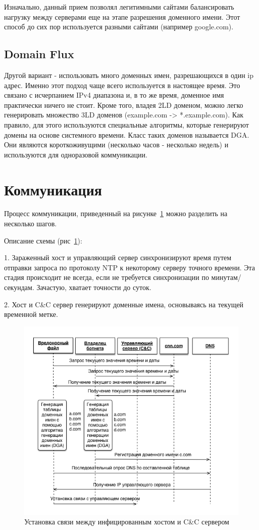 \documentclass[a4paper,14pt]{extreport} %
\begin{document}
Изначально, данный прием позволял легитимными сайтами балансировать нагрузку между серверами еще на этапе разрешения доменного имени. Этот способ до сих пор используется разными сайтами (например google.com).
	
\subsection{Domain Flux}
\label{ss:dflux}
Другой вариант - использовать много доменных имен, разрешающихся в один ip адрес. Именно этот подход чаще всего используется в настоящее время. Это связано с исчерпанием IPv4 диапазона и, в то же время, доменное имя практически ничего не стоит. Кроме того, владея 2LD доменом, можно легко генерировать множество 3LD доменов (example.com -> *.example.com).
Как правило, для этого используются специальные алгоритмы, которые генерируют домены на основе системного времени. Класс таких доменов называется DGA. Они являются короткоживущими (несколько часов - несколько недель) и используются для одноразовой коммуникации. 



\section{Коммуникация}
Процесс коммуникации, приведенный на рисунке~\ref{fig:comn} можно разделить на несколько шагов.

Описание схемы (рис~\ref{fig:comn}):
	
1. Зараженный хост и управляющий сервер синхронизируют время путем отправки запроса по протоколу NTP к некоторому серверу точного времени. Эта стадия происходит не всегда, если не требуется синхронизации по минутам/секундам. Зачастую, хватает точности до суток.
	
2. Хост и C\&C сервер генерируют доменные имена, основываясь на текущей временной метке.
\begin{figure}[H]
	\centering
	\includegraphics[scale=0.75]{communicate.png}
	\caption{Установка связи между инфицированным хостом и C\&C сервером}
	\label{fig:comn}
\end{figure}
\end{document}
